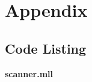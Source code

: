 \documentclass[./Report_main.tex]{subfiles}
\begin{document}


\chapter{Appendix}
\section*{Code Listing}
\textbf{scanner.mll}
%
%
%
%
%
%
%
\end{document}
